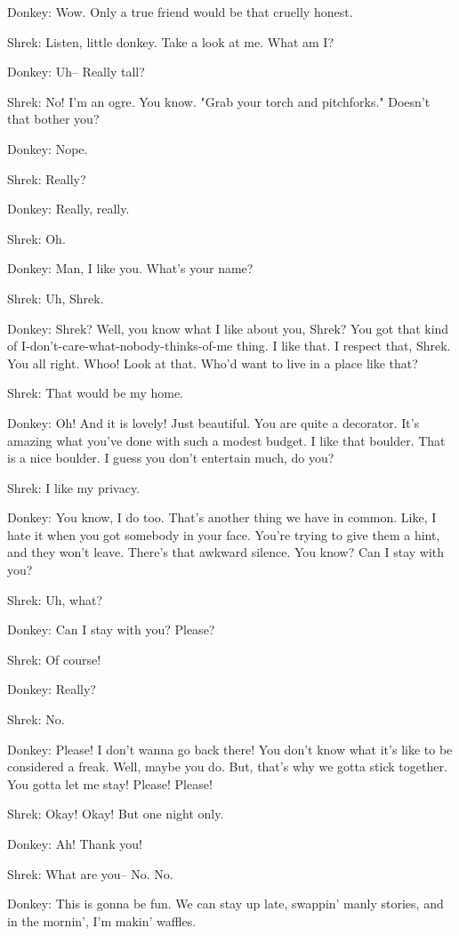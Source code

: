 \documentclass{article}
\begin{document}
Donkey:
Wow. Only a true friend would be that cruelly honest.

Shrek:
Listen, little donkey. Take a look at me. What am I?

Donkey:
Uh-- Really tall?

Shrek:
No! I'm an ogre. You know. "Grab your torch and pitchforks." Doesn't that bother you?

Donkey:
Nope.

Shrek:
Really?

Donkey:
Really, really.

Shrek:
Oh.

Donkey:
Man, I like you. What's your name?

Shrek:
Uh, Shrek.

Donkey:
Shrek? Well, you know what I like about you, Shrek? You got that kind of I-don't-care-what-nobody-thinks-of-me thing. I like that. I respect that, Shrek. You all right. Whoo! Look at that. Who'd want to live in a place like that?

Shrek:
That would be my home.

Donkey:
Oh! And it is lovely! Just beautiful. You are quite a decorator. It's amazing what you've done with such a modest budget. I like that boulder. That is a nice boulder. I guess you don't entertain much, do you?

Shrek:
I like my privacy.

Donkey:
You know, I do too. That's another thing we have in common. Like, I hate it when you got somebody in your face. You're trying to give them a hint, and they won't leave. There's that awkward silence. You know? Can I stay with you?

Shrek:
Uh, what?

Donkey:
Can I stay with you? Please?

Shrek:
Of course!

Donkey:
Really?

Shrek:
No.

Donkey:
Please! I don't wanna go back there! You don't know what it's like to be considered a freak. Well, maybe you do. But, that's why we gotta stick together. You gotta let me stay! Please! Please!

Shrek:
Okay! Okay! But one night only.

Donkey:
Ah! Thank you!

Shrek:
What are you-- No. No.

Donkey:
This is gonna be fun. We can stay up late, swappin' manly stories, and in the mornin', I'm makin' waffles.
\end{document}
